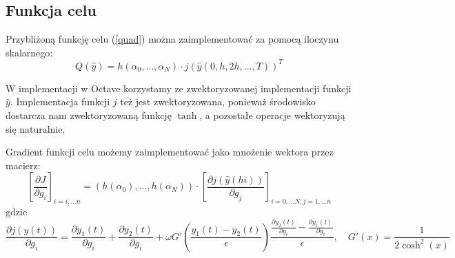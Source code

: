 \documentclass[11pt]{article}
\begin{document}
\subsection{Funkcja celu}
Przybliżoną funkcję celu (\ref{quad}) można zaimplementować za pomocą iloczynu skalarnego:
\begin{equation}
  Q(\hat{y}) = h(\alpha_0,\ldots,\alpha_N) \cdot {j(\hat{y}(0, h, 2h, \ldots, T))}^T
\end{equation}

W implementacji w Octave korzystamy ze zwektoryzowanej implementacji funkcji $\hat{y}$. Implementacja funkcji $j$ też jest zwektoryzowana, ponieważ środowisko dostarcza nam zwektoryzowaną funkcję $\tanh$, a pozostałe operacje wektoryzują się naturalnie.

Gradient funkcji celu możemy zaimplementować jako mnożenie wektora przez macierz:
\begin{equation}
  {\left[\frac{\partial J}{\partial g_i}\right]}_{i = i, \ldots n} = \left(h(\alpha_0),\ldots,h(\alpha_N)\right) \cdot {\left[\frac{\partial j(\hat{y}(hi))}{\partial g_j}\right]}_{i = 0, \ldots N, j = 1, \ldots n}
\end{equation}
gdzie
\begin{equation}
  \frac{\partial j(y(t))}{\partial g_i} = \frac{\partial y_1(t)}{\partial g_i} + \frac{\partial y_2(t)}{\partial g_i} + \omega G'\left(\frac{y_1(t) - y_2(t)}{\epsilon}\right)\frac{\frac{\partial y_2(t)}{\partial g_i} - \frac{\partial y_1(t)}{\partial g_i}}{\epsilon},\quad G'(x) = \frac{1}{2\cosh^2(x)}
\end{equation}
\end{document}
